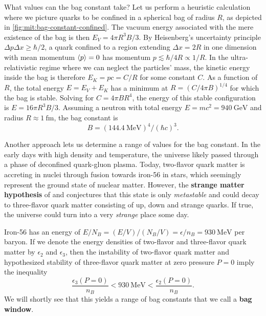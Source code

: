 What values can the bag constant take?
Let us perform a heuristic calculation where we picture quarks to be confined in a spherical bag of radius $R$, as depicted in \cref{fig:mit:bag-constant-confined}.
The vacuum energy associated with the mere existence of the bag is then $E_V = 4 \pi R^3 B / 3$.
By Heisenberg's uncertainty principle $\Delta p \Delta x \geq \hbar/2$, a quark confined to a region extending $\Delta x = 2R$ in one dimension with mean momentum $\langle p \rangle = 0$ has momentum $p \lesssim \hbar/4R \propto 1/R$.
In the ultra-relativistic regime where we can neglect the particles' mass, the kinetic energy inside the bag is therefore $E_K = pc = C / R$ for some constant $C$.
As a function of $R$, the total energy $E = E_V + E_K$ has a minimum at $R = (C/4 \pi B)^{1/4}$ for which the bag is stable.
Solving for $C = 4 \pi B R^4$, the energy of this stable configuration is $E = 16 \pi R^3 B / 3$.
Assuming a neutron with total energy $E = m c^2 = \SI{940}{\giga\electronvolt}$ and radius $R \approx \SI{1}{\femto\meter}$,
the bag constant is
\begin{equation}
	B = (\SI{144.4}{\mega\electronvolt})^4 / (\hbar c)^3.
\label{eq:mit:bag_constant_optimal}
\end{equation}

Another approach lets us determine a range of values for the bag constant.
In the early days with high density and temperature, the universe likely passed through a phase of deconfined quark-gluon plasma.
Today, two-flavor quark matter is accreting in nuclei through fusion towards iron-56 in stars, which seemingly represent the ground state of nuclear matter.
However, the \textbf{strange matter hypothesis} of \cite{ref:strange_hypothesis_bodmer} and \cite{ref:strange_hypothesis_witten} conjectures that this state is only \emph{metastable}
and could decay to three-flavor quark matter consisting of up, down and strange quarks.
If true, the universe could turn into a very \emph{strange} place some day.

Iron-56 has an energy of $E/N_B = (E/V) / (N_B/V) = \epsilon/n_B = \SI{930}{\mega\electronvolt}$ per baryon.
If we denote the energy densities of two-flavor and three-flavor quark matter by $\epsilon_2$ and $\epsilon_3$,
then the instability of two-flavor quark matter and hypothesized stability of three-flavor quark matter at zero pressure $P=0$ imply the inequality
\begin{equation}
	\frac{\epsilon_3(P=0)}{n_B} < \SI{930}{\mega\electronvolt} < \frac{\epsilon_2(P=0)}{n_B} .
\label{eq:mit:bag_stability}
\end{equation}
We will shortly see that this yields a range of bag constants that we call a \textbf{bag window}.

